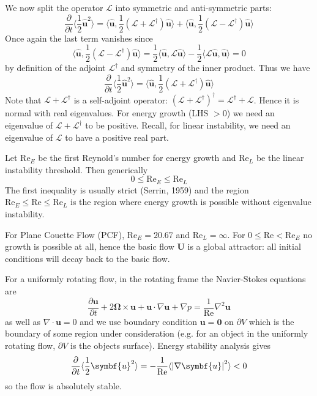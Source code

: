 \documentclass{jknotes}
\renewcommand{\u}{\symbf{u}}
\newcommand{\U}{\symbf{U}}
\newcommand{\ReN}{\text{Re}}
\renewcommand{\L}{\mathcal{L}}
\begin{document}
We now split the operator $\L$ into symmetric and anti-symmetric parts:
\begin{equation}
\frac{\partial}{\partial t} \langle \frac{1}{2}\hat{\u}^2 \rangle = \langle
\hat{\u}, \frac{1}{2}(\L + \L^\dagger)\hat{\u}\rangle + \langle \hat{\u},
\frac{1}{2}(\L-\L^\dagger)\hat{\u}\rangle
\end{equation}
Once again the last term vanishes since
\begin{equation}
	\langle \hat{\u}, \frac{1}{2}(\L-\L^\dagger)\hat{\u}\rangle = \frac{1}{2}
	\langle \hat{\u}, \L \hat{\u} \rangle - \frac{1}{2}\langle \L \hat{\u},
	\hat{\u} \rangle = 0
\end{equation}
by definition of the adjoint $\L^\dagger$ and symmetry of the inner product.
Thus we have
\begin{equation}
	\frac{\partial}{\partial t} \langle \frac{1}{2}\hat{\u}^2 \rangle = \langle
	\hat{\u}, \frac{1}{2}(\L + \L^\dagger)\hat{\u}\rangle
\end{equation}
Note that $\L + \L^\dagger$ is a self-adjoint operator:
$(\L+\L^\dagger)^\dagger = \L^\dagger + \L$. Hence it is normal with real
eigenvalues. For energy growth (LHS $> 0$) we need an eigenvalue of $\L +
\L^\dagger$ to be positive. Recall, for linear instability, we need an
eigenvalue of $\L$ to have a positive real part.

Let $\ReN_E$ be the first Reynold's number for energy growth and
$\ReN_L$ be the linear instability threshold. Then generically
\begin{equation}
	0 \le \ReN_E \le \ReN_L
\end{equation}
The first inequality is usually strict (Serrin, 1959) and the region $\ReN_E
\le \ReN \le \ReN_L$ is the region where energy growth is possible without
eigenvalue instability. 

\begin{eg}
	For Plane Couette Flow (PCF), $\ReN_E = 20.67$ and $\ReN_L = \infty$. For
	$0 \le \ReN < \ReN_E$ no growth is possible at all, hence the basic flow
	$\U$ is a global attractor: all initial conditions will decay back to the
	basic flow.
\end{eg}

\begin{eg}
	For a uniformly rotating flow, in the rotating frame the Navier-Stokes
	equations are
	\begin{equation}
		\frac{\partial \u}{\partial t} + 2\symbf{\Omega} \times \u + \u \cdot
		\nabla \u + \nabla p = \frac{1}{\ReN} \nabla^2 \u
	\end{equation}
	as well as $\nabla \cdot \u = 0$ and we use boundary condition $\u =
	\symbf{0}$ on $\partial V$ which is the boundary of some region under
	consideration (e.g. for an object in the uniformly rotating flow,
	$\partial V$ is the objects surface). Energy stability analysis gives
	\begin{equation}
		\frac{\partial}{\partial t} \langle \frac{1}{2}\u^2\rangle =
		-\frac{1}{\ReN} \langle \abs{\nabla \u}^2\rangle < 0
	\end{equation}
	so the flow is absolutely stable.
\end{eg}
\end{document}
